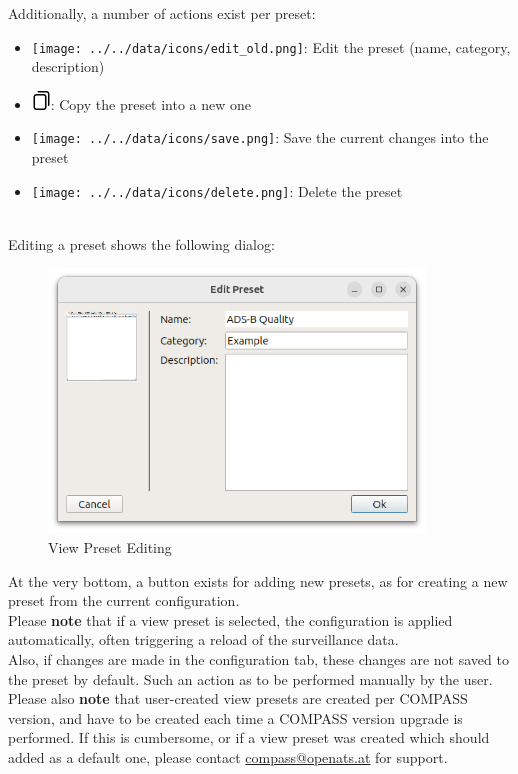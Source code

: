 Additionally, a number of actions exist per preset:

\begin{itemize}
 \item \texttt{[image: ../../data/icons/edit\_old.png]}: Edit the preset (name, category, description)
 \item \includegraphics[width=0.5cm,frame]{../../data/icons/copy.png}: Copy the preset into a new one
 \item \texttt{[image: ../../data/icons/save.png]}: Save the current changes into the preset
 \item \texttt{[image: ../../data/icons/delete.png]}: Delete the preset
\end{itemize} \ \\

Editing a preset shows the following dialog:

\begin{figure}[H]
    \includegraphics[width=10cm]{figures/view_preset_edit.png}
  \caption{View Preset Editing}
\end{figure}

At the very bottom, a button exists for adding new presets, as for creating a new preset from the current configuration. \\

Please \textbf{note} that if a view preset is selected, the configuration is applied automatically, often triggering a reload of the surveillance data. \\
Also, if changes are made in the configuration tab, these changes are not saved to the preset by default. Such an action as to be performed manually by the user. \\

Please also \textbf{note} that user-created view presets are created per COMPASS version, and have to be created each time a COMPASS version upgrade is performed. If this is cumbersome, or if a view preset was created which should added as a default one, please contact \href{mailto:compass@openats.at}{compass@openats.at} for support.

